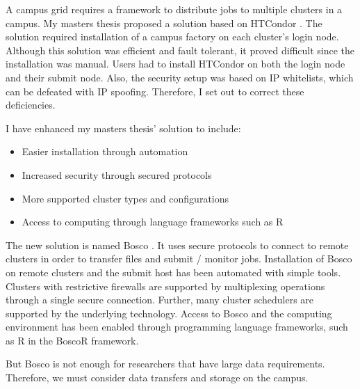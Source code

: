 A campus grid requires a framework to distribute jobs to multiple clusters in a campus.  My masters thesis \cite{weitzel2011campus} proposed a solution based on HTCondor \cite{litzkow1988condor}.  The solution required installation of a campus factory \cite{website:campusfactory} on each cluster's login node.  Although this solution was efficient and fault tolerant, it proved difficult since the installation was manual.  Users had to install HTCondor on both the login node and their submit node.  Also, the security setup was based on IP whitelists, which can be defeated with IP spoofing.  Therefore, I set out to correct these deficiencies.

I have enhanced my masters thesis' solution to include:
\begin{itemize}
\item Easier installation through automation
\item Increased security through secured protocols
\item More supported cluster types and configurations
\item Access to computing through language frameworks such as R \cite{team2005r}
\end{itemize}

The new solution is named Bosco \cite{chep2013weitzel}.  It uses secure protocols to connect to remote clusters in order to transfer files and submit / monitor jobs.  Installation of Bosco on remote clusters and the submit host has been automated with simple tools.  Clusters with restrictive firewalls are supported by multiplexing operations through a single secure connection.  Further, many cluster schedulers are supported by the underlying technology.  Access to Bosco and the computing environment has been enabled through programming language frameworks, such as R in the BoscoR  framework.

But Bosco is not enough for researchers that have large data requirements.  Therefore, we must consider data transfers and storage on the campus.





